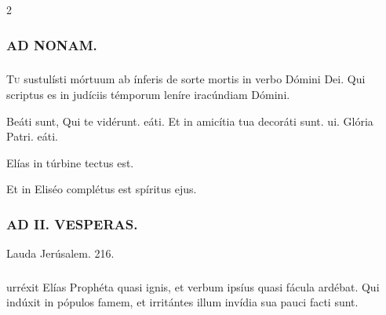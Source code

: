 \documentclass[9pt,twoside]{extarticle}
\begin{document}
\begin{multicols}{2}
\subsubsection*{\center \textsc{AD NONAM.}}
\subsubsection*{}
\lettrine{T}u sustulísti mórtuum ab ínferis de sorte mortis in verbo Dómini Dei. Qui scriptus es in judíciis témporum leníre iracúndiam Dómini.

\begin{tightlist}
\item {} Beáti sunt, \textred{*} Qui te vidérunt. eáti.  Et in amicítia tua decoráti sunt. ui. Glória Patri. eáti.
\item {} Elías in túrbine tectus est. 
\item {} Et in Eliséo complétus est spíritus ejus.
\end{tightlist}

\subsubsection*{\center \textsc{AD II. VESPERAS.}}
\begin{tightlist}
\item {} Lauda Jerúsalem. 216.
\end{tightlist}

\subsubsection*{}
urréxit Elías Prophéta quasi ignis, et verbum ipsíus quasi fácula ardébat. Qui indúxit in pópulos famem, et irritántes illum invídia sua pauci facti sunt.


\end{multicols}
\end{document}

